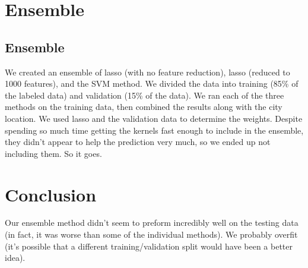 \documentclass[a4paper,10pt]{article}
\begin{document}
 
\section{Ensemble}
\subsection*{Ensemble}
We created an ensemble of lasso (with no feature reduction), lasso (reduced to 1000 features), and the SVM method. We divided the data into training (85\% of the labeled data) and validation (15\% of the data). We ran each of the three methods on the training data, then combined the results along with the city location. We used lasso and the validation data to determine the weights. Despite spending so much time getting the kernels fast enough to include in the ensemble, they didn't appear to help the prediction very much, so we ended up not including them. So it goes.

\section{Conclusion}
Our ensemble method didn't seem to preform incredibly well on the testing data (in fact, it was worse than some of the individual methods). We probably overfit (it's possible that a different training/validation split would have been a better idea). 
 
\end{document}
